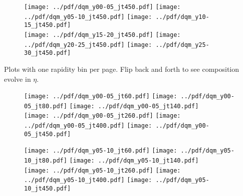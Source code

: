 \documentclass[landscape,10pt]{beamer} %
\begin{document}
\newpage

\begin{figure}[p]
\centering
\texttt{[image: ../pdf/dqm\_y00-05\_jt450.pdf]}
\texttt{[image: ../pdf/dqm\_y05-10\_jt450.pdf]}
\texttt{[image: ../pdf/dqm\_y10-15\_jt450.pdf]}\\
\texttt{[image: ../pdf/dqm\_y15-20\_jt450.pdf]}
\texttt{[image: ../pdf/dqm\_y20-25\_jt450.pdf]}
\texttt{[image: ../pdf/dqm\_y25-30\_jt450.pdf]}
\end{figure}


\newpage

Plots with one rapidity bin per page. Flip back and forth to see composition evolve in $\eta$.

\newpage

\begin{figure}[p]
\texttt{[image: ../pdf/dqm\_y00-05\_jt60.pdf]}
\texttt{[image: ../pdf/dqm\_y00-05\_jt80.pdf]}
\texttt{[image: ../pdf/dqm\_y00-05\_jt140.pdf]}\\
\texttt{[image: ../pdf/dqm\_y00-05\_jt260.pdf]}
\texttt{[image: ../pdf/dqm\_y00-05\_jt400.pdf]}
\texttt{[image: ../pdf/dqm\_y00-05\_jt450.pdf]}
\end{figure}

\newpage

\begin{figure}[p]
\texttt{[image: ../pdf/dqm\_y05-10\_jt60.pdf]}
\texttt{[image: ../pdf/dqm\_y05-10\_jt80.pdf]}
\texttt{[image: ../pdf/dqm\_y05-10\_jt140.pdf]}\\
\texttt{[image: ../pdf/dqm\_y05-10\_jt260.pdf]}
\texttt{[image: ../pdf/dqm\_y05-10\_jt400.pdf]}
\texttt{[image: ../pdf/dqm\_y05-10\_jt450.pdf]}
\end{figure}

\newpage
\end{document}
